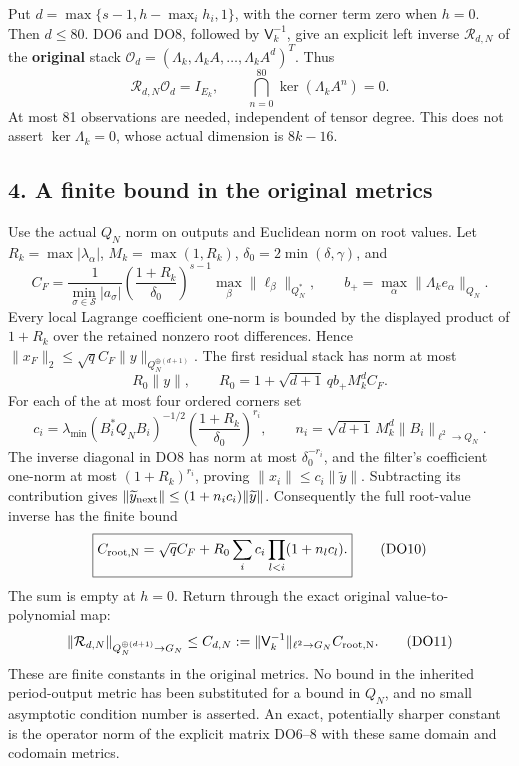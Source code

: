 \documentclass[11pt]{article}
\begin{document}
Put \(d=\max\{s-1,h-\max_i h_i,1\}\), with the corner term zero when \(h=0\). Then \(d\le80\). DO6 and DO8, followed by \(\mathsf V_k^{-1}\), give an explicit left inverse \(\mathcal R_{d,N}\) of the \textbf{original} stack \(\mathcal O_d=(\Lambda_k,\Lambda_k A,\ldots,\Lambda_k A^d)^T\). Thus \[
\boxed{\displaystyle
\mathcal R_{d,N}\mathcal O_d=I_{E_k},\qquad
\bigcap_{n=0}^{80}\ker(\Lambda_k A^n)=0.}
\tag{DO9}
\] At most 81 observations are needed, independent of tensor degree. This does not assert \(\ker\Lambda_k=0\), whose actual dimension is \(8k-16\).

\subsection{4. A finite bound in the original metrics}\label{a-finite-bound-in-the-original-metrics}

Use the actual \(Q_N\) norm on outputs and Euclidean norm on root values. Let \(R_k=\max|\lambda_\alpha|\), \(M_k=\max(1,R_k)\), \(\delta_0=2\min(\delta,\gamma)\), and \[
C_F=\frac1{\min_{\sigma\in\mathcal S}|a_\sigma|}
\left(\frac{1+R_k}{\delta_0}\right)^{s-1}
\max_\beta\|\ell_\beta\|_{Q_N^*},\qquad
b_+=\max_\alpha\|\Lambda_k e_\alpha\|_{Q_N}.
\] Every local Lagrange coefficient one-norm is bounded by the displayed product of \(1+R_k\) over the retained nonzero root differences. Hence \(\|x_F\|_2\le\sqrt q C_F\|y\|_{Q_N^{\oplus(d+1)}}\). The first residual stack has norm at most \[
R_0\|y\|,\qquad
R_0=1+\sqrt{d+1}\,q b_+M_k^d C_F.
\] For each of the at most four ordered corners set \[
c_i=\lambda_{\min}(B_i^*Q_NB_i)^{-1/2}
\left(\frac{1+R_k}{\delta_0}\right)^{r_i},\qquad
n_i=\sqrt{d+1}\,M_k^d\|B_i\|_{\ell^2\to Q_N}.
\] The inverse diagonal in DO8 has norm at most \(\delta_0^{-r_i}\), and the filter's coefficient one-norm at most \((1+R_k)^{r_i}\), proving \(\|x_i\|\le c_i\|\widetilde y\|\). Subtracting its contribution gives \(\|\widetilde y_{\rm next}\|\le(1+n_ic_i)\|\widetilde y\|\). Consequently the full root-value inverse has the finite bound \[
\boxed{\displaystyle
C_{\rm root,N}=\sqrt q C_F+
R_0\sum_i c_i\prod_{l<i}(1+n_lc_l).}
\tag{DO10}
\] The sum is empty at \(h=0\). Return through the exact original value-to-polynomial map: \[
\|\mathcal R_{d,N}\|_{Q_N^{\oplus(d+1)}\to G_N}
\le C_{d,N}:=\|\mathsf V_k^{-1}\|_{\ell^2\to G_N}C_{\rm root,N}.
\tag{DO11}
\] These are finite constants in the original metrics. No bound in the inherited period-output metric has been substituted for a bound in \(Q_N\), and no small asymptotic condition number is asserted. An exact, potentially sharper constant is the operator norm of the explicit matrix DO6--8 with these same domain and codomain metrics.
\end{document}
